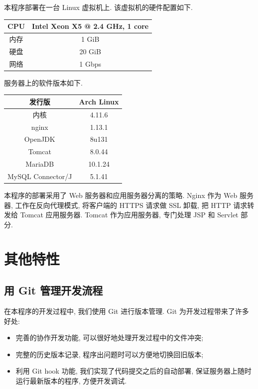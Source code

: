 \documentclass[a4paper,10pt]{article}
\begin{document}
本程序部署在一台 Linux 虚拟机上. 该虚拟机的硬件配置如下.
\begin{center}
	\begin{tabular}{c|c} \hline
		CPU & Intel Xeon X5 @ 2.4 GHz, 1 core \\ \hline 
		内存 & 1 GiB \\ \hline
		硬盘 & 20 GiB \\ \hline
		网络 & 1 Gbps \\ \hline
	\end{tabular}
\end{center}

服务器上的软件版本如下.
\begin{center}
	\begin{tabular}{c|c} \hline
		发行版 & Arch Linux \\ \hline 
		内核 & 4.11.6 \\ \hline
		nginx & 1.13.1 \\ \hline
		OpenJDK & 8u131 \\ \hline
		Tomcat & 8.0.44 \\ \hline
		MariaDB & 10.1.24 \\ \hline
		MySQL Connector/J & 5.1.41 \\ \hline
	\end{tabular}
\end{center}

本程序的部署采用了 Web 服务器和应用服务器分离的策略. Nginx 作为 Web 服务器, 工作在反向代理模式, 将客户端的 HTTPS 请求做 SSL 卸载, 把 HTTP 请求转发给 Tomcat 应用服务器. Tomcat 作为应用服务器, 专门处理 JSP 和 Servlet 部分.

\section{其他特性}

\subsection{用 Git 管理开发流程}

在本程序的开发过程中, 我们使用 Git 进行版本管理. Git 为开发过程带来了许多好处:
\begin{itemize}
	\item 完善的协作开发功能, 可以很好地处理开发过程中的文件冲突;
	\item 完整的历史版本记录, 程序出问题时可以方便地切换回旧版本;
	\item 利用 Git hook 功能, 我们实现了代码提交之后的自动部署, 保证服务器上随时运行最新版本的程序, 方便开发调试.
\end{itemize}
\end{document}
